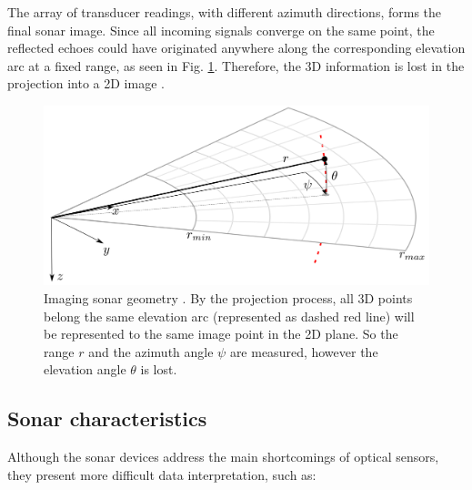 \documentclass[final,5p,times]{elsarticle}
\begin{document}
The array of transducer readings, with different azimuth directions, forms the final sonar image. Since all incoming signals converge on the same point, the reflected echoes could have originated anywhere along the corresponding elevation arc at a fixed range, as seen in Fig. \ref{fig:sonar_geometry}. Therefore, the 3D information is lost in the projection into a 2D image \cite{huang2015}.

\begin{figure}[h]
    \includegraphics[width=\columnwidth]{figs/sonar_geometry}
    \centering
    \captionsetup{justification=centering}
    \caption{Imaging sonar geometry \cite{huang2015}. By the projection process, all 3D points belong the same elevation arc (represented as dashed red line) will be represented to the same image point in the 2D plane. So the range $r$ and the azimuth angle $\psi$ are measured, however the elevation angle $\theta$ is lost.}
    \label{fig:sonar_geometry}
\end{figure}


\subsection{Sonar characteristics}
\label{sonar:characteristics}

Although the sonar devices address the main shortcomings of optical sensors, they present more difficult data interpretation, such as:
\end{document}
